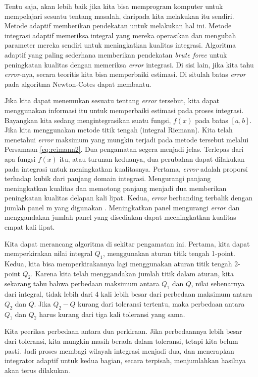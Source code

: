 \documentclass[
]{book}
\theoremstyle{definition}
\theoremstyle{definition}
\theoremstyle{definition}
\theoremstyle{definition}
\theoremstyle{remark}
\begin{document}
Tentu saja, akan lebih baik jika kita bisa memprogram komputer untuk mempelajari sesuatu tentang masalah, daripada kita melakukan itu sendiri. Metode adaptif memberikan pendekatan untuk melakukan hal ini. Metode integrasi adaptif memeriksa integral yang mereka operasikan dan mengubah parameter mereka sendiri untuk meningkatkan kualitas integrasi. Algoritma adaptif yang paling sederhana memberikan pendekatan \emph{brute force} untuk peningkatan kualitas dengan memeriksa \emph{error} integrasi. Di sisi lain, jika kita tahu \emph{error}-nya, secara teoritis kita bisa memperbaiki estimasi. Di situlah batas \emph{error} pada algoritma Newton-Cotes dapat membantu.

Jika kita dapat menemukan sesuatu tentang \emph{error} tersebut, kita dapat menggunakan informasi itu untuk memperbaiki estimasi pada proses integrasi. Bayangkan kita sedang mengintegrasikan suatu fungsi, \(f \left(x\right)\) pada batas \(\left[a, b\right]\). Jika kita menggunakan metode titik tengah (integral Riemann). Kita telah menetahui \emph{error} maksimum yang mungkin terjadi pada metode tersebut melalui Persamaan \eqref{eq:reimann2}. Dua pengamatan segera menjadi jelas. Terlepas dari apa fungsi \(f \left(x\right)\) itu, atau turunan keduanya, dua perubahan dapat dilakukan pada integrasi untuk meningkatkan kualitasnya. Pertama, \emph{error} adalah proporsi terhadap kubik dari panjang domain integrasi. Mengurangi panjang meningkatkan kualitas dan memotong panjang menjadi dua memberikan peningkatan kualitas delapan kali lipat. Kedua, \emph{error} berbanding terbalik dengan jumlah panel m yang digunakan . Meningkatkan panel mengurangi \emph{error} dan menggandakan jumlah panel yang disediakan dapat meeningkatkan kualitas empat kali lipat.

Kita dapat merancang algoritma di sekitar pengamatan ini. Pertama, kita dapat memperkirakan nilai integral \(Q_1\), menggunakan aturan titik tengah 1-point. Kedua, kita bisa memperkirakannya lagi menggunakan aturan titik tengah 2-point \(Q_2\). Karena kita telah menggandakan jumlah titik dalam aturan, kita sekarang tahu bahwa perbedaan maksimum antara \(Q_1\) dan \(Q\), nilai sebenarnya dari integral, tidak lebih dari 4 kali lebih besar dari perbedaan maksimum antara \(Q_2\) dan \(Q\). Jika \(Q_2 −Q\) kurang dari toleransi tertentu, maka perbedaan antara \(Q_1\) dan \(Q_2\) harus kurang dari tiga kali toleransi yang sama.

Kita peeriksa perbedaan antara dua perkiraan. Jika perbedaannya lebih besar dari toleransi, kita mungkin masih berada dalam toleransi, tetapi kita belum pasti. Jadi proses membagi wilayah integrasi menjadi dua, dan menerapkan integrator adaptif untuk kedua bagian, secara terpisah, menjumlahkan hasilnya akan terus dilakukan.
\end{document}
